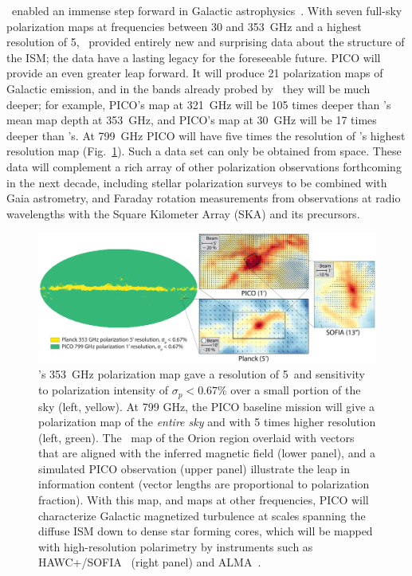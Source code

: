 \documentclass[PICOReport.tex]{subfiles}
\begin{document}
\planck\ enabled an immense step forward in Galactic astrophysics~\citep{Planck2018:XII}. With seven full-sky polarization maps at frequencies between 30 and 353~GHz and a highest resolution of 5\arcmin, \planck\ provided entirely new and surprising data about the structure of the \ac{ISM}; the data have a lasting legacy for the foreseeable future. PICO will provide an even greater leap forward. It will produce 21 polarization maps of Galactic emission, and in the bands already probed by \planck\ they will be much deeper; for example, PICO's map at 321~GHz will be 105 times deeper than \planck's mean map depth at 353~GHz, and PICO's map at 30~GHz will be 17 times deeper than \planck's.  At 799~GHz PICO will have five times the resolution of \planck 's highest resolution map (Fig.~\ref{fig:allsky}). Such a data set can only be obtained from space. These data will complement a rich array of other polarization observations forthcoming in the next decade, including stellar polarization surveys to be combined with Gaia astrometry, and Faraday rotation measurements from  observations at radio wavelengths with the  Square Kilometer Array (SKA) and its precursors.
\begin{figure}[ht]
    \centering
    \includegraphics[width=6.5in]{galsci_fig_v4.pdf}
\vspace{-0.25in}
    \caption{\captiontext  \planck 's 353~GHz polarization map gave a resolution of 5\arcmin~and sensitivity to polarization intensity of $\sigma_{p} < 0.67\%$ over a small portion of the sky (left, yellow).  At 799 GHz, the PICO baseline mission will give a polarization map of the {\it entire sky} and with 5 times higher resolution (left, green). The \planck~map of the Orion region overlaid with vectors that are aligned with the inferred magnetic field (lower panel), and a simulated PICO observation (upper panel) illustrate the leap in information content (vector lengths are proportional to polarization fraction). With this map, and maps at other frequencies, PICO will characterize Galactic magnetized turbulence at scales spanning the diffuse ISM down to dense star forming cores, which will be mapped with high-resolution polarimetry by instruments such as HAWC+/SOFIA~\citep{Chuss2018} (right panel) and ALMA~\citep{Bacciotti2018ApJ}.
    \label{fig:allsky} }
\vspace{-0.10in}
\end{figure}
\end{document}

